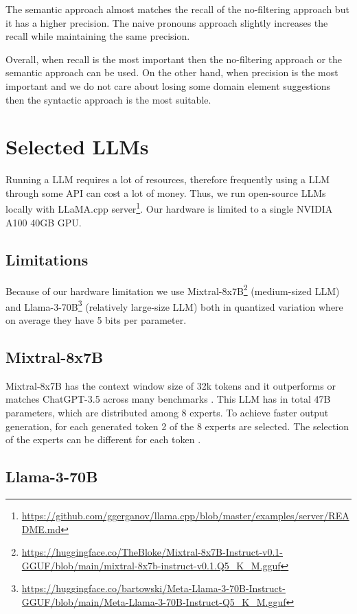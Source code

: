 The semantic approach almost matches the recall of the no-filtering approach but it has a higher precision. The naive pronouns approach slightly increases the recall while maintaining the same precision.

Overall, when recall is the most important then the no-filtering approach or the semantic approach can be used. On the other hand, when precision is the most important and we do not care about losing some domain element suggestions then the syntactic approach is the most suitable.


\section{Selected LLMs}

Running a LLM requires a lot of resources, therefore frequently using a LLM through some API can cost a lot of money. Thus, we run open-source LLMs locally with LLaMA.cpp server\footnote{\url{https://github.com/ggerganov/llama.cpp/blob/master/examples/server/README.md}}. Our hardware is limited to a single NVIDIA A100 40GB GPU.

\subsection{Limitations}

Because of our hardware limitation we use Mixtral-8x7B\footnote{\url{https://huggingface.co/TheBloke/Mixtral-8x7B-Instruct-v0.1-GGUF/blob/main/mixtral-8x7b-instruct-v0.1.Q5_K_M.gguf}} (medium-sized LLM) \cite{Jiang2024} and Llama-3-70B\footnote{\url{https://huggingface.co/bartowski/Meta-Llama-3-70B-Instruct-GGUF/blob/main/Meta-Llama-3-70B-Instruct-Q5_K_M.gguf}} (relatively large-size LLM) both in quantized variation where on average they have 5 bits per parameter.


\subsection{Mixtral-8x7B}

Mixtral-8x7B has the context window size of 32k tokens and it outperforms or matches ChatGPT-3.5 across many benchmarks \cite{Jiang2024}. This LLM has in total 47B parameters, which are distributed among 8 experts. To achieve faster output generation, for each generated token 2 of the 8 experts are selected. The selection of the experts can be different for each token \cite{Jiang2024}.


\subsection{Llama-3-70B}


